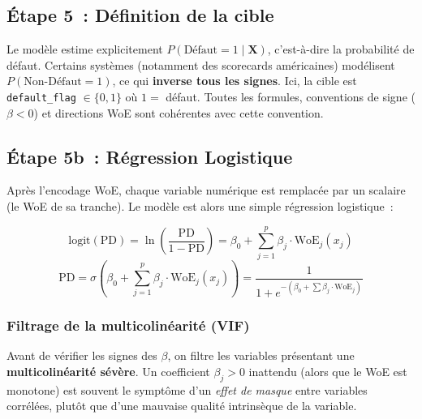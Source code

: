 \documentclass[12pt,a4paper]{article}
\begin{document}
\subsection{\'Etape 5~: D\'efinition de la cible}

\begin{warningbox}
Le mod\`ele estime explicitement $P(\text{D\'efaut} = 1 \mid \mathbf{X})$, c'est-\`a-dire la probabilit\'e de d\'efaut. Certains syst\`emes (notamment des scorecards am\'ericaines) mod\'elisent $P(\text{Non-D\'efaut} = 1)$, ce qui \textbf{inverse tous les signes}. Ici, la cible est \texttt{default\_flag} $\in \{0, 1\}$ o\`u $1 =$ d\'efaut. Toutes les formules, conventions de signe ($\beta < 0$) et directions WoE sont coh\'erentes avec cette convention.
\end{warningbox}

\subsection{\'Etape 5b~: R\'egression Logistique}

Apr\`es l'encodage WoE, chaque variable num\'erique est remplac\'ee par un scalaire (le WoE de sa tranche). Le mod\`ele est alors une simple r\'egression logistique~:

\begin{formulebox}
\begin{equation}
    \text{logit}(\text{PD}) = \ln\left(\frac{\text{PD}}{1 - \text{PD}}\right) = \beta_0 + \sum_{j=1}^{p} \beta_j \cdot \text{WoE}_j(x_j)
    \label{eq:logit}
\end{equation}
\begin{equation}
    \text{PD} = \sigma\left(\beta_0 + \sum_{j=1}^{p} \beta_j \cdot \text{WoE}_j(x_j)\right) = \frac{1}{1 + e^{-(\beta_0 + \sum \beta_j \cdot \text{WoE}_j)}}
    \label{eq:pd}
\end{equation}
\end{formulebox}

\subsubsection{Filtrage de la multicolin\'earit\'e (VIF)}

Avant de v\'erifier les signes des $\beta$, on filtre les variables pr\'esentant une \textbf{multicolin\'earit\'e s\'ev\`ere}. Un coefficient $\beta_j > 0$ inattendu (alors que le WoE est monotone) est souvent le sympt\^ome d'un \textit{effet de masque} entre variables corr\'el\'ees, plut\^ot que d'une mauvaise qualit\'e intrins\`eque de la variable.
\end{document}
